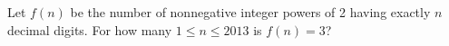 Let $ f(n)$ be the number of nonnegative integer powers of 2 having exactly $ n $ decimal digits. For how many $ 1\le n\le2013 $ is $ f(n)=3 $?
